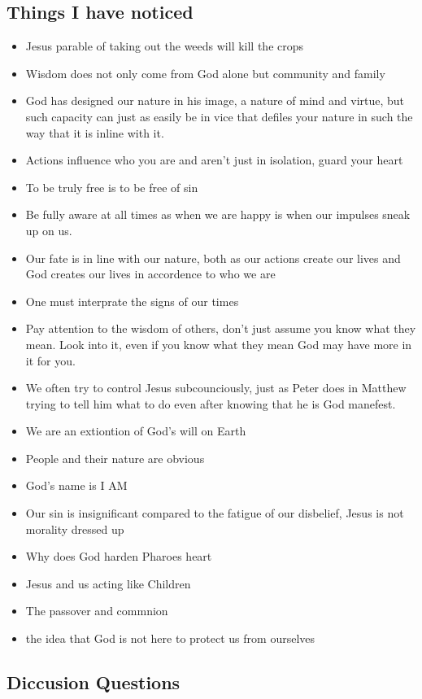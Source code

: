 \subsection{Things I have noticed}
\begin{itemize}
\item Jesus parable of taking out the weeds will kill the crops
\item Wisdom does not only come from God alone but community and family
\item God has designed our nature in his image, a nature of mind and virtue, but such capacity can just as easily be in vice that defiles your nature in such the way that it is inline with it.
\item Actions influence who you are and aren't just in isolation, guard your heart
\item To be truly free is to be free of sin
\item Be fully aware at all times as when we are happy is when our impulses sneak up on us.
\item Our fate is in line with our nature, both as our actions create our lives and God creates our lives in accordence to who we are
\item One must interprate the signs of our times
\item Pay attention to the wisdom of others, don't just assume you know what they mean. Look into it, even if you know what they mean God may have more in it for you.
\item We often try to control Jesus subcounciously, just as Peter does in Matthew trying to tell him what to do even after knowing that he is God manefest.
\item We are an extiontion of God's will on Earth
\item People and their nature are obvious
\item God's name is I AM
\item Our sin is insignificant compared to the fatigue of our disbelief, Jesus is not morality dressed up
\item Why does God harden Pharoes heart
\item Jesus and us acting like Children
\item The passover and commnion
  \item the idea that God is not here to protect us from ourselves
\end{itemize}

\subsection{Diccusion Questions}

